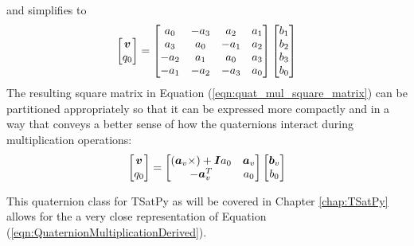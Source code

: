 and simplifies to
\begin{equation}
  \begin{bmatrix} \boldsymbol{v} \\ q_0 \end{bmatrix} =
  \begin{bmatrix}
    a_0 & - a_3 &   a_2 & a_1 \\
    a_3 &   a_0 & - a_1 & a_2 \\
  - a_2 &   a_1 &   a_0 & a_3 \\
  - a_1 & - a_2 & - a_3 & a_0
  \end{bmatrix}
  \begin{bmatrix}
  b_1 \\ b_2 \\ b_3 \\ b_0
  \end{bmatrix}
  \label{eqn:quat_mul_square_matrix}
\end{equation}
The resulting square matrix in Equation (\ref{eqn:quat_mul_square_matrix}) can be partitioned appropriately so that it can be expressed more compactly and in a way that conveys a better sense of how the quaternions interact during multiplication operations:
\begin{equation}
  \begin{bmatrix} \boldsymbol{v} \\ q_0 \end{bmatrix} =
  \begin{bmatrix}
    (\boldsymbol{a}_v \times) + \boldsymbol{I} a_0 & \boldsymbol{a}_v \\
    -\boldsymbol{a}_v^T                    & a_0 \\
  \end{bmatrix}
  \begin{bmatrix}
  \boldsymbol{b}_v \\ b_0
  \end{bmatrix}
  \label{eqn:QuaternionMultiplicationDerived}
\end{equation}

This quaternion class for TSatPy as will be covered in Chapter \ref{chap:TSatPy} allows for the a very close representation of Equation (\ref{eqn:QuaternionMultiplicationDerived}).


